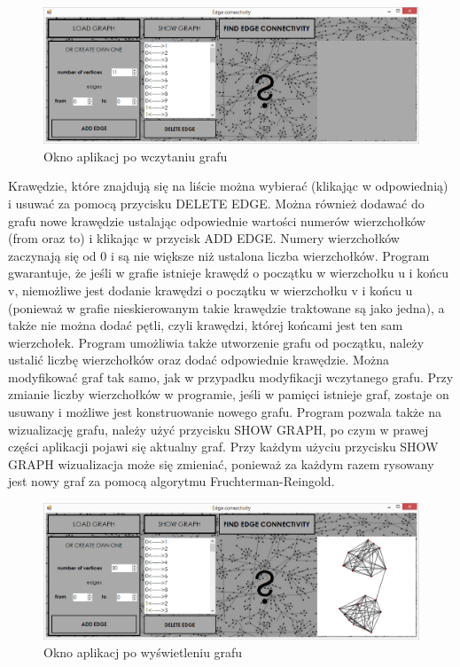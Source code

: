 \documentclass{article}
\begin{document}
\begin{figure}[h]
\centering
\includegraphics[scale=0.4]{02}
\caption{Okno aplikacj po wczytaniu grafu}
\end{figure}

Krawędzie, które znajdują się na liście można wybierać (klikając w odpowiednią) i usuwać za pomocą przycisku DELETE EDGE. Można również dodawać do grafu nowe krawędzie ustalając odpowiednie wartości numerów wierzchołków (from oraz to) i klikając w przycisk ADD EDGE. Numery wierzchołków zaczynają się od 0 i są nie większe niż ustalona liczba wierzchołków. Program gwarantuje, że jeśli w grafie istnieje krawędź o początku w wierzchołku u i końcu v, niemożliwe jest dodanie krawędzi o początku w wierzchołku v i końcu u (ponieważ w grafie nieskierowanym takie krawędzie traktowane są jako jedna), a także nie można dodać pętli, czyli krawędzi, której końcami jest ten sam wierzchołek.
Program umożliwia także utworzenie grafu od początku, należy ustalić liczbę wierzchołków oraz dodać odpowiednie krawędzie. Można modyfikować graf tak samo, jak w przypadku modyfikacji wczytanego grafu.
Przy zmianie liczby wierzchołków w programie, jeśli w pamięci istnieje graf, zostaje on usuwany i możliwe jest konstruowanie nowego grafu.
Program pozwala także na wizualizację grafu, należy użyć przycisku SHOW GRAPH, po czym w prawej części aplikacji pojawi się aktualny graf. Przy każdym użyciu przycisku SHOW GRAPH wizualizacja może się zmieniać, ponieważ za każdym razem rysowany jest nowy graf za pomocą algorytmu Fruchterman-Reingold.
 
\begin{figure}[h]
\centering
\includegraphics[scale=0.4]{03}
\caption{Okno aplikacj po wyświetleniu grafu}
\end{figure}
 
\end{document}
